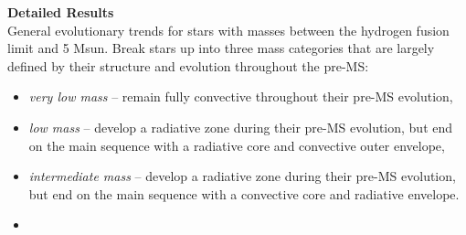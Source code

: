 \textbf{Detailed Results} \\
General evolutionary trends for stars with masses between the hydrogen fusion limit and 5 Msun. Break stars up into three mass categories that are largely defined by their structure and evolution throughout the pre-MS: 
\begin{itemize}
 \item[] {\it very low mass} -- remain fully convective throughout their pre-MS evolution,
 \item[] {\it low mass} -- develop a radiative zone during their pre-MS evolution, but end on the main sequence with a radiative core and convective outer envelope,
 \item[] {\it intermediate mass} -- develop a radiative zone during their pre-MS evolution, but end on the main sequence with a convective core and radiative envelope.
 \item[] {\it}
\end{itemize}